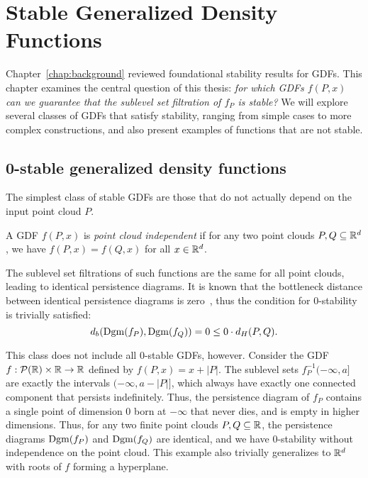 \chapter{Stable Generalized Density Functions}
\label{chap:stable_functions}

Chapter~\ref{chap:background} reviewed foundational stability results for GDFs.
This chapter examines the central question of this thesis: \emph{for which GDFs
$f(P, x)$ can we guarantee that the sublevel set filtration of $f_P$ is stable?}
We will explore several classes of GDFs that satisfy stability, ranging from
simple cases to more complex constructions, and also present examples of
functions that are not stable.

\section{0-stable generalized density functions}

The simplest class of stable GDFs are those that do not actually depend on the
input point cloud $P$.
\begin{definition}
    A GDF $f(P, x)$ is \emph{point cloud independent} if for any two point
    clouds $P, Q \subseteq \mathbb{R}^d$, we have $f(P, x) = f(Q, x)$ for all
    $x \in \mathbb{R}^d$.
\end{definition}
The sublevel set filtrations of such functions are the same for all point
clouds, leading to identical persistence diagrams. It is known that the
bottleneck distance between identical persistence diagrams is
zero~\cite{edelsbrunner2010computational}, thus the condition for $0$-stability
is trivially satisfied:
\begin{equation}
    d_b(\operatorname{Dgm}(f_P), \operatorname{Dgm}(f_Q)) = 0 \leq 0 \cdot d_H(P, Q).
\end{equation}

This class does not include all $0$-stable GDFs, however. Consider the GDF
$f : \mathcal{P}(\mathbb{R}) \times \mathbb{R} \to \mathbb{R}$ defined by $f(P, x) = x + |P|$. The
sublevel sets $f_P^{-1}(-\infty, a]$ are exactly the intervals
$(-\infty, a - |P|]$, which always have exactly one connected component
that persists indefinitely. Thus, the persistence diagram of $f_P$ contains a
single point of dimension $0$ born at $-\infty$ that never dies, and is empty
in higher dimensions. Thus, for any two finite point clouds $P, Q \subseteq \mathbb{R}$,
the persistence diagrams $\operatorname{Dgm}(f_P)$ and $\operatorname{Dgm}(f_Q)$ are identical, and we have
$0$-stability without independence on the point cloud.
This example also trivially generalizes to $\mathbb{R}^d$ with roots of $f$ forming a
hyperplane.

